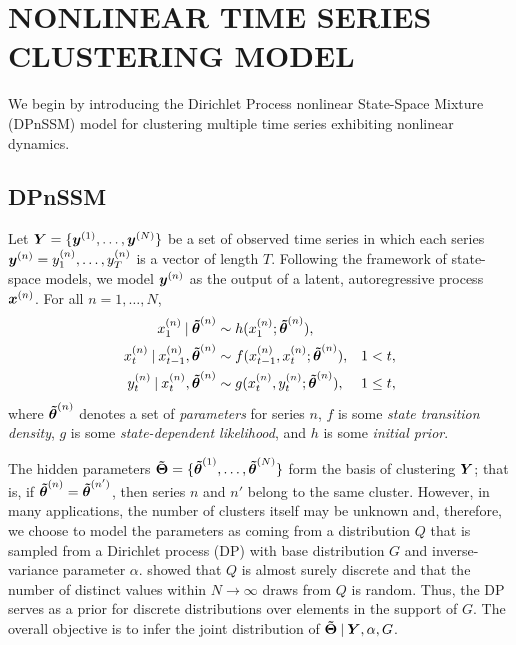\documentclass[twoside]{article}
\begin{document}
\section{NONLINEAR TIME SERIES CLUSTERING MODEL}

We begin by introducing the Dirichlet Process nonlinear State-Space Mixture (DPnSSM) model for clustering multiple time series exhibiting nonlinear dynamics.

\subsection{DPnSSM} \label{sec:DPnSSM}

Let $\bd Y = \{\bidx y 1, \ldots, \bidx y N\}$ be a set of observed time series in which each series $\bidx y n = \idx[1] y n, \ldots, \idx[T] y n$ is a vector of length $T$.  Following the framework of state-space models, we model $\bidx y n$ as the output of a latent, autoregressive process $\bidx x n$.  For all $n = 1, \ldots, N$,
\begin{align}
{\idx[1] x n} \given \idx {\bd{\tilde{\theta}}} n &\sim h(\idx[1] x n; \idx {\bd{\tilde{\theta}}} n), \\
\idx[t] x n \given \idx[t-1] x n, \idx {\bd{\tilde{\theta}}} n &\sim f(\idx[t-1] x n, \idx[t] x n; \idx {\bd{\tilde{\theta}}} n), &   1 < t,  \nonumber \\ 
\idx[t] y n \given \idx[t] x n, \idx {\bd{\tilde{\theta}}} n &\sim g(\idx[t] x n, \idx[t] y n; \idx {\bd{\tilde{\theta}}} n ),  &  1 \leq t, \nonumber
\end{align}
where $\idx {\bd{\tilde{\theta}}} n$ denotes a set of \emph{parameters} for series $n$, $f$ is some \emph{state transition density}, $g$ is some \emph{state-dependent likelihood}, and {$h$ is some \emph{initial prior}}.  %

The hidden parameters ${\bd{\tilde{\Theta}}}  = \{\idx {\bd{\tilde{\theta}}}  1, \ldots, \idx {\bd{\tilde{\theta}}}  N\}$ form the basis of clustering $\bd Y$; that is, if $\bidx \ttheta n = \bidx \ttheta {n'}$, then series $n$ and $n'$ belong to the same cluster.  However, in many applications, the number of clusters itself may be unknown and, therefore, we choose to model the parameters as coming from a distribution $Q$ that is sampled from a Dirichlet process (DP) with base distribution $G$ and inverse-variance parameter $\alpha$.  \cite{ferguson1973bayesian} showed that $Q$ is almost surely discrete and that the number of distinct values within $N \to \infty$ draws from $Q$ is random.  Thus, the DP serves as a prior for discrete distributions over elements in the support of $G$.  The overall objective is to infer the joint distribution of ${\bd{\tilde{\Theta}}} \given \bd Y, \alpha, G$.
\end{document}
